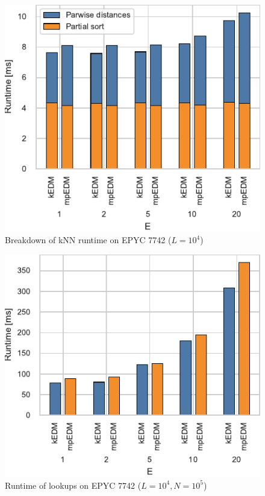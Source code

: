 \documentclass[conference]{IEEEtran}
\begin{document}
\begin{figure}
    \centering
    \includegraphics{figs/breakdown_knn_epyc}
    \caption{Breakdown of kNN runtime on EPYC 7742 ($L=10^4$)}%
    \label{fig:breakdown-knn-epyc}
\end{figure}

\begin{figure}
    \centering
    \includegraphics{figs/runtime_lookup_epyc}
    \caption{Runtime of lookups on EPYC 7742 ($L=10^4, N=10^5$)}%
    \label{fig:breakdown-lookup-epyc}
\end{figure}
\end{document}
